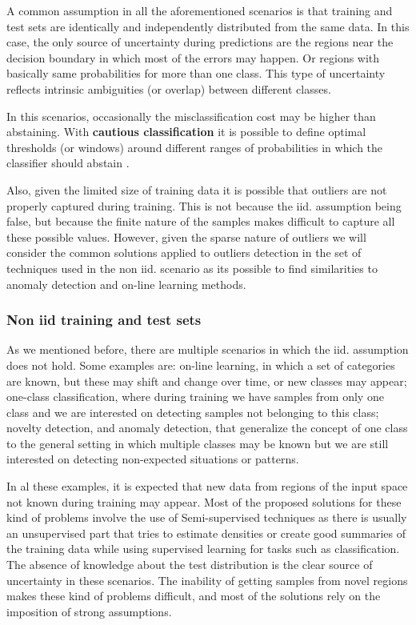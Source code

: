 \documentclass[a4paper, 12pt]{article}
\begin{document}
A common assumption in all the aforementioned scenarios is that training and test sets are  identically and independently distributed from the same data.
In this case, the only source of uncertainty during predictions are the regions near the decision boundary in which most of the errors may happen.
Or regions with basically same probabilities for more than one class.
This type of uncertainty reflects intrinsic ambiguities (or overlap) between different classes.

In this scenarios, occasionally the misclassification cost may be higher than abstaining.
With \textbf{cautious classification} it is possible to define optimal thresholds (or windows) around different ranges of probabilities in which the classifier should abstain \cite{Ferri2004,Chow1970}.

Also, given the limited size of training data it is possible that outliers are not properly captured during training. This is not because the iid. assumption being false, but because the finite nature of the samples makes difficult to capture all these possible values. 
However, given the sparse nature of outliers we will consider the common solutions applied to outliers detection in the set of techniques used in the non iid. scenario as its possible to find similarities to anomaly detection and on-line learning methods.

\subsubsection{Non iid training and test sets}
\label{sec:no:iid}

As we mentioned before, there are multiple scenarios in which the iid. assumption does not hold.
Some examples are: on-line learning, in which a set of categories are known, but these may shift and change over time, or new classes may appear; one-class classification, where during training we have samples from only one class and we are interested on detecting samples not belonging to this class; novelty detection, and anomaly detection, that generalize the concept of one class to the general setting in which multiple classes may be known but we are still interested on detecting non-expected situations or patterns.

In al these examples, it is expected that new data from regions of the input space not known during training may appear. 
Most of the proposed solutions for these kind of problems involve the use of Semi-supervised techniques as there is usually an unsupervised part that tries to estimate densities or create good summaries of the training data while using supervised learning for tasks such as classification.
The absence of knowledge about the test distribution is the clear source of uncertainty in these scenarios.
The inability of getting samples from novel regions makes these kind of problems difficult, and most of the solutions rely on the imposition of strong assumptions.
\end{document}
